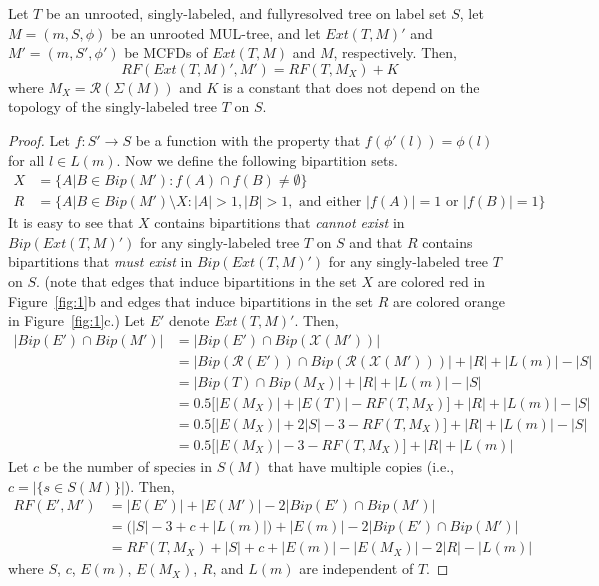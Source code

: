 \begin{lemma}
\label{lem:mulrf2}
Let $T$ be an unrooted, singly-labeled, and \gls{fullyresolved} tree on label set $S$, 
let $M = (m, S, \phi)$ be an unrooted MUL-tree, and
let $Ext(T,M)'$ and $M' = (m, S', \phi')$ be MCFDs of $Ext(T,M)$ and $M$, respectively.
Then,
\begin{equation}
	\label{eq:mulrf2}
	RF(Ext(T,M)', M') = RF(T, M_X) + K
\end{equation}
where $M_X = \mathcal{R}(\Sigma(M))$ and $K$ is a constant that does not depend on the \gls{topology} of the singly-labeled tree $T$ on $S$.
\end{lemma}
\begin{proof}
Let $f: S' \rightarrow S$ be a function with the property that $f(\phi'(l)) = \phi(l)$ for all $l \in L(m)$.
Now we define the following bipartition sets.
\begin{align}
	X &= \{  A|B \in Bip(M') : f(A) \cap f(B) \neq \emptyset \} \\
	R &= \{ A|B \in Bip(M') \setminus X : |A| > 1, |B| > 1, \text{ and either } |f(A)| = 1 \text{ or } |f(B)| = 1 \}
\end{align}
It is easy to see that $X$ contains bipartitions that {\em cannot exist} in $Bip(Ext(T,M)')$ for any singly-labeled tree $T$ on $S$ and that $R$ contains bipartitions that {\em must exist} in $Bip(Ext(T,M)')$ for any singly-labeled tree $T$ on $S$.
(note that edges that induce bipartitions in the set $X$ are colored red in Figure~\ref{fig:1}b and edges that induce bipartitions in the set $R$ are colored orange in Figure~\ref{fig:1}c.)
Let $E'$ denote $Ext(T,M)'$. Then,
\begin{align}
| Bip(E') \cap Bip(M') | &= | Bip(E') \cap Bip(\mathcal{X}(M')) | \\
	&= | Bip(\mathcal{R}(E')) \cap Bip(\mathcal{R}(\mathcal{X}(M'))) | + | R | + |L(m)| - | S | \nonumber  \\
	&= | Bip(T) \cap Bip(M_X) | + | R | + |L(m)| - | S | \nonumber \\
	&= 0.5 \big[ | E(M_X)| + | E(T) | - RF(T, M_X) \big] + | R | + |L(m)| - | S | \nonumber \\
	&= 0.5 \big[ | E(M_X)| + 2 | S | - 3 - RF(T, M_X) \big] + | R | + |L(m)| - | S | \nonumber \\
	&= 0.5 \big[ | E(M_X) | - 3 - RF(T, M_X) \big] + | R | + |L(m)| \nonumber
\end{align}
Let $c$ be the number of species in $S(M)$ that have multiple copies (i.e., $c = | \{ s \in S(M) \}|$). 
Then,
\begin{align}
RF(E', M') &= |E(E') | + |E(M')| - 2| Bip(E') \cap Bip(M') | \\
&= \big( |S| - 3 + c + |L(m)|  \big)  + | E(m) | - 2| Bip(E') \cap Bip(M') | \nonumber \\
&= RF(T, M_X) + |S| + c + | E(m) | - | E(M_X) | - 2 |R| - |L(m)| \nonumber
\end{align}
where $S$, $c$, $E(m)$, $E(M_X)$, $R$, and $L(m)$ are independent of $T$.
\end{proof}

